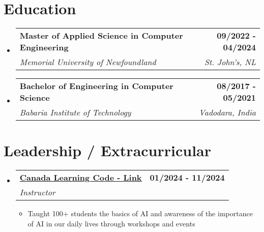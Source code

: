 \documentclass[letterpaper,11pt]{article}
\makeatletter
\newcommand{\resumeItem}[1]{
  \item\small{
    {#1 \vspace{-2pt}}
  }
}
\newcommand{\resumeSubheading}[4]{
  \vspace{-2pt}\item
    \begin{tabular*}{1.0\textwidth}[t]{l@{\extracolsep{\fill}}r}
      \textbf{#1} & \textbf{\small #2} \\
      \textit{\small#3} & \textit{\small #4} \\
    \end{tabular*}\vspace{-7pt}
}
\newcommand{\resumeSubHeadingListStart}{\begin{itemize}[leftmargin=0.0in, label={}]}
\newcommand{\resumeSubHeadingListEnd}{\end{itemize}}
\newcommand{\resumeItemListStart}{\begin{itemize}}
\newcommand{\resumeItemListEnd}{\end{itemize}\vspace{-5pt}}
\makeatother
\begin{document}
\section{Education}
\resumeSubHeadingListStart
\resumeSubheading
{Master of Applied Science in Computer Engineering}{09/2022 - 04/2024}
{Memorial University of Newfoundland}{St. John's, NL}
\resumeSubheading
{Bachelor of Engineering in Computer Science}{08/2017 - 05/2021}
{Babaria Institute of Technology}{Vadodara, India}
\resumeSubHeadingListEnd
\section{Leadership / Extracurricular}
    \resumeSubHeadingListStart
        \resumeSubheading{\href{https://www.canadalearningcode.ca/}{\underline{Canada Learning Code - Link}}}{01/2024 - 11/2024}{Instructor}{}
          \resumeItemListStart
            \resumeItem{Taught 100+ students the basics of AI and awareness of the importance of AI in our daily lives through workshops and events}
          \resumeItemListEnd

        \resumeSubHeadingListEnd
\end{document}
